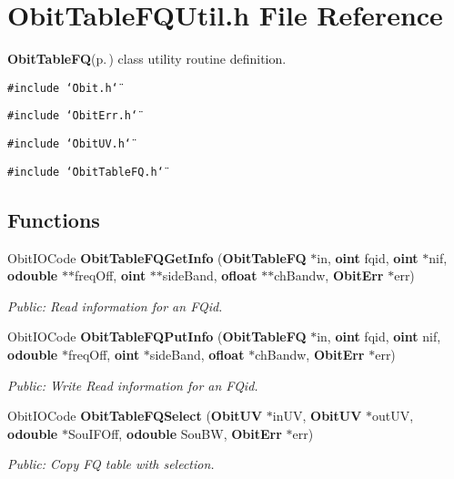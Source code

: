 \section{Obit\-Table\-FQUtil.h File Reference}
\label{ObitTableFQUtil_8h}
{\bf Obit\-Table\-FQ}{\rm (p.\,\pageref{structObitTableFQ})} class utility routine definition. 

{\tt \#include \char`\"{}Obit.h\char`\"{}}\par
{\tt \#include \char`\"{}Obit\-Err.h\char`\"{}}\par
{\tt \#include \char`\"{}Obit\-UV.h\char`\"{}}\par
{\tt \#include \char`\"{}Obit\-Table\-FQ.h\char`\"{}}\par
\subsection*{Functions}
\begin{CompactItemize}
\item 
Obit\-IOCode {\bf Obit\-Table\-FQGet\-Info} ({\bf Obit\-Table\-FQ} $\ast$in, {\bf oint} fqid, {\bf oint} $\ast$nif, {\bf odouble} $\ast$$\ast$freq\-Off, {\bf oint} $\ast$$\ast$side\-Band, {\bf ofloat} $\ast$$\ast$ch\-Bandw, {\bf Obit\-Err} $\ast$err)
\begin{CompactList}\small\item\em Public: Read information for an FQid. \item\end{CompactList}\item 
Obit\-IOCode {\bf Obit\-Table\-FQPut\-Info} ({\bf Obit\-Table\-FQ} $\ast$in, {\bf oint} fqid, {\bf oint} nif, {\bf odouble} $\ast$freq\-Off, {\bf oint} $\ast$side\-Band, {\bf ofloat} $\ast$ch\-Bandw, {\bf Obit\-Err} $\ast$err)
\begin{CompactList}\small\item\em Public: Write Read information for an FQid. \item\end{CompactList}\item 
Obit\-IOCode {\bf Obit\-Table\-FQSelect} ({\bf Obit\-UV} $\ast$in\-UV, {\bf Obit\-UV} $\ast$out\-UV, {\bf odouble} $\ast$Sou\-IFOff, {\bf odouble} Sou\-BW, {\bf Obit\-Err} $\ast$err)
\begin{CompactList}\small\item\em Public: Copy FQ table with selection. \item\end{CompactList}\end{CompactItemize}


